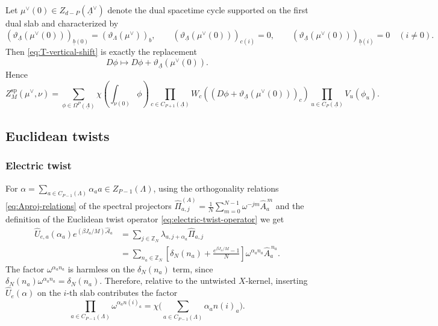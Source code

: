 \documentclass[dvipsnames,a4paper]{article}
\numberwithin{equation}{section}
\theoremstyle{definition}
\theoremstyle{remark}
\begin{document}
Let \(\mu^\vee(0)\in Z_{d-P}(\underline\Lambda^\vee)\) denote the dual spacetime cycle
supported on the first dual slab and characterized by
\begin{equation}
	\left(\vartheta_{\underline\Lambda}(\mu^\vee(0))\right)_{\underline b(0)}
	=
	(\vartheta_\Lambda(\mu^\vee))_b,
	\qquad
	\left(\vartheta_{\underline\Lambda}(\mu^\vee(0))\right)_{c(i)}=0,
	\qquad
	\left(\vartheta_{\underline\Lambda}(\mu^\vee(0))\right)_{\underline b(i)}=0
	\quad(i\neq 0).
	\label{eq:mu0-cocycle}
\end{equation}
Then \eqref{eq:T-vertical-shift} is exactly the replacement
\begin{equation}
	D\phi
	\mapsto
	D\phi+\vartheta_{\underline\Lambda}(\mu^\vee(0)).
\end{equation}
Hence
\begin{equation}
	Z_M^{\mathrm{sp}}(\mu^\vee,\nu)
	=
	\sum_{\phi\in\Omega^P(\underline\Lambda)}
	\chi\left(\int_{\nu(0)}\phi\right)
	\prod_{c\in C_{P+1}(\underline\Lambda)}
	W_c\left((D\phi+\vartheta_{\underline\Lambda}(\mu^\vee(0)))_c\right)
	\prod_{u\in C_P(\underline\Lambda)}
	V_u(\phi_u).
	\label{eq:spatial-insertions-spacetime}
\end{equation}


\subsection{Euclidean twists}
\label{app:TrTwists}
\subsubsection{Electric twist}
\label{app:electric-twist}

For $\alpha=\sum_{a \in C_{P-1}(\Lambda)} \alpha_a a \in Z_{P-1}(\Lambda)$, using the orthogonality relations \eqref{eq:Aproj-relations} of the spectral projectors $\hat\Pi_{a,j}^{(A)} = \frac1N\sum_{m=0}^{N-1}\omega^{-jm}\hat A_a^{\,m}$ and the definition of the Euclidean twist operator \eqref{eq:electric-twist-operator} we get
\begin{align}
	\hat U_{e,a}(\alpha_a)e^{(\beta J_a/M)\hat{\mathcal A}_a}
	&=
	\sum_{j\in\mathbb Z_N}\lambda_{a,j+\alpha_a}\hat\Pi_{a,j}
	\nonumber\\
	&=
	\sum_{n_a\in\mathbb Z_N}
	\left[
	\delta_N(n_a)+\frac{e^{\beta J_a/M}-1}{N}
	\right]
	\omega^{\alpha_a n_a}\hat A_a^{\,n_a}.
	\label{eq:Ue-shift}
\end{align}
The factor \(\omega^{\alpha_a n_a}\) is harmless on the \(\delta_N(n_a)\) term, since
\(\delta_N(n_a)\omega^{\alpha_a n_a}=\delta_N(n_a)\). Therefore, relative to the untwisted
\(X\)-kernel, inserting \(\hat U_e(\alpha)\) on the \(i\)-th slab contributes the factor
\begin{equation}
	\prod_{a\in C_{P-1}(\Lambda)}\omega^{\alpha_a n(i)_a}
	=
	\chi\Biggl(\sum_{a\in C_{P-1}(\Lambda)}\alpha_a n(i)_a\Biggr).
	\label{eq:electric-slab-factor}
\end{equation}
\end{document}
